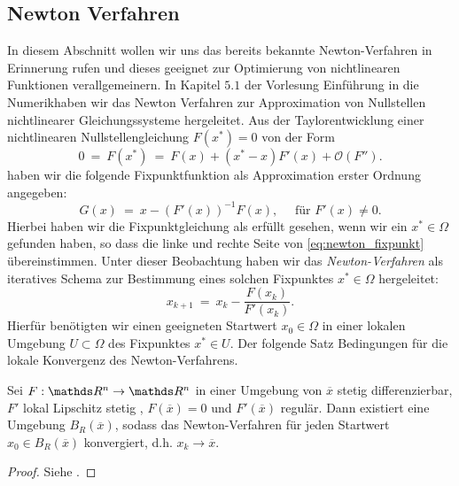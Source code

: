 \subsection{Newton Verfahren}
\label{ss:newton}
In diesem Abschnitt wollen wir uns das bereits bekannte Newton-Verfahren in Erinnerung rufen und dieses geeignet zur Optimierung von nichtlinearen Funktionen verallgemeinern. 
In Kapitel $5.1$ der Vorlesung \glqq Einführung in die Numerik\grqq haben wir das Newton Verfahren zur Approximation von Nullstellen nichtlinearer Gleichungssysteme hergeleitet. 
Aus der Taylorentwicklung einer nichtlinearen Nullstellengleichung $F(x^*) = 0$ von der Form
\begin{equation*}
0 \ = \ F(x^*) \ = \ F(x) + (x^* - x) F'(x) + \mathcal{O}(F'').
\end{equation*}
haben wir die folgende Fixpunktfunktion als Approximation erster Ordnung angegeben: 
\begin{equation}
\label{eq:newton_fixpunkt}
G(x) \ = \ x - (F'(x))^{-1} F(x), \quad \text{ für } F'(x) \neq 0.
\end{equation}
Hierbei haben wir die Fixpunktgleichung als erfüllt gesehen, wenn wir ein $x^* \in \Omega$ gefunden haben, so dass die linke und rechte Seite von \eqref{eq:newton_fixpunkt} übereinstimmen. Unter dieser Beobachtung haben wir das \textit{Newton-Verfahren} als iteratives Schema zur Bestimmung eines solchen Fixpunktes $x^* \in \Omega$ hergeleitet:
\begin{equation}
x_{k+1} \ = \ x_k - \frac{F(x_k)}{F'(x_k)}.
\end{equation}
Hierfür benötigten wir einen geeigneten Startwert $x_0 \in \Omega$ in einer lokalen Umgebung $U \subset \Omega$ des Fixpunktes $x^* \in U$. Der folgende Satz Bedingungen für die lokale Konvergenz des Newton-Verfahrens. 
\begin{theorem}{}{}
Sei $F: \R^n \rightarrow \R^n$ in einer Umgebung von $\overline{x}$ stetig differenzierbar,  $F'$ lokal Lipschitz stetig , $F(\overline{x}) = 0$ und  $F'(\overline{x})$  regul\"ar. Dann existiert eine Umgebung $B_R(\overline{x})$, sodass das Newton-Verfahren f\"ur jeden Startwert $x_0 \in B_R(\overline{x})$ konvergiert, d.h. $x_k \rightarrow \overline{x}$.
\end{theorem}
\begin{proof}
Siehe \cite[Satz 5.7]{numerik1}.
\end{proof}

